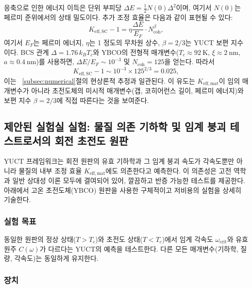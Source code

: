 \documentclass[12pt,a4paper]{article}
\begin{document}
	응축으로 인한 에너지 이득은 단위 부피당 \(\Delta E = \frac{1}{2} N(0) \Delta^2\)이며, 여기서 \(N(0)\)는 페르미 준위에서의 상태 밀도이다. 추가 조정 효율은 다음과 같이 표현될 수 있다:
	\[
	K_{\mathrm{eff,SC}} - 1 = \eta \frac{\Delta E}{E_F} \cdot N_{\text{coh}}^{\beta},
	\]
	여기서 \(E_F\)는 페르미 에너지, \(\eta\)는 1 정도의 무차원 상수, \(\beta = 2/3\)는 YUCT 보편 지수이다. BCS 관계 \(\Delta = 1.76 \, k_B T_c\)와 YBCO의 전형적 매개변수(\(T_c \approx 92\ \text{K}\), \(\xi \approx 2\ \text{nm}\), \(a \approx 0.4\ \text{nm}\))를 사용하면, \(\Delta E/E_F \sim 10^{-3}\) 및 \(N_{\text{coh}} = 125\)을 얻는다. 따라서
	\[
	K_{\mathrm{eff,SC}} - 1 \sim 10^{-3} \times 125^{2/3} = 0.025,
	\]
	이는 ~\ref{subsec:numerical}절의 현상론적 추정과 일관된다. 이 유도는 \(K_{\mathrm{eff,mat}}\)이 임의 매개변수가 아니라 초전도체의 미시적 매개변수(갭, 코히어런스 길이, 페르미 에너지)와 보편 지수 \(\beta = 2/3\)에 직접 따른다는 것을 보여준다.
	
	\subsection{제안된 실험실 실험: 물질 의존 기하학 및 임계 붕괴 테스트로서의 회전 초전도 원판}
	
	YUCT 프레임워크는 회전 원판의 유효 기하학과 그 임계 붕괴 속도가 각속도뿐만 아니라 물질의 내부 조정 효율 \(K_{\mathrm{eff,mat}}\)에도 의존한다고 예측한다. 이 의존성은 고전 역학과 일반 상대성 이론 모두에 결여되어 있어, 깔끔하고 반증 가능한 테스트를 제공한다. 아래에서 고온 초전도체(YBCO) 원판을 사용한 구체적이고 저비용의 실험을 상세히 기술한다.
	
	\subsubsection{실험 목표}
	
	동일한 원판의 정상 상태(\(T > T_c\))와 초전도 상태(\(T < T_c\))에서 임계 각속도 \(\omega_{\text{crit}}\)와 유효 원주 \(C(\omega)\)가 다르다는 YUCT의 예측을 테스트한다. 다른 모든 매개변수(기하학, 질량, 각속도)는 동일하게 유지한다.
	
	\subsubsection{장치}
	
\end{document}
